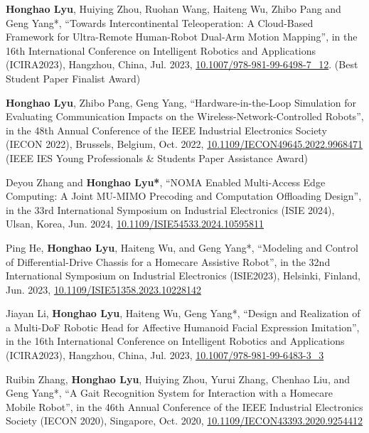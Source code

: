 \begin{enumerate}[align=left, widest={[\textbf{S.1}]}, itemindent=0em, label={\textbf{[\arabic*]}]
    \item[\textbf{[C.16]}] \textbf{Honghao Lyu}, Huiying Zhou, Ruohan Wang, Haiteng Wu, Zhibo Pang and Geng Yang*, ``Towards Intercontinental Teleoperation: A Cloud-Based Framework for Ultra-Remote Human-Robot Dual-Arm Motion Mapping'', in the 16th International Conference on Intelligent Robotics and Applications (ICIRA2023), Hangzhou, China, Jul. 2023, \href{https://doi.org/10.1007/978-981-99-6498-7_12}{10.1007/978-981-99-6498-7\_12}. (Best Student Paper Finalist Award)
    \item[\textbf{[C.15]}] \textbf{Honghao Lyu}, Zhibo Pang, Geng Yang, ``Hardware-in-the-Loop Simulation for Evaluating Communication Impacts on the Wireless-Network-Controlled Robots'', in the 48th Annual Conference of the IEEE Industrial Electronics Society (IECON 2022), Brussels, Belgium, Oct. 2022, \href{https://doi.org/10.1109/IECON49645.2022.9968471}{10.1109/IECON49645.2022.9968471} (IEEE IES Young Professionals \& Students Paper Assistance Award)
    \item[\textbf{[C.14]}] Deyou Zhang and \textbf{Honghao Lyu*}, ``NOMA Enabled Multi-Access Edge Computing: A Joint MU-MIMO Precoding and Computation Offloading Design'', in the 33rd International Symposium on Industrial Electronics (ISIE 2024), Ulsan, Korea, Jun. 2024, \href{https://doi.org/10.1109/ISIE54533.2024.10595811}{10.1109/ISIE54533.2024.10595811}
    \item[\textbf{[C.13]}] Ping He, \textbf{Honghao Lyu}, Haiteng Wu, and Geng Yang*, ``Modeling and Control of Differential-Drive Chassis for a Homecare Assistive Robot'', in the 32nd International Symposium on Industrial Electronics (ISIE2023), Helsinki, Finland, Jun. 2023, \href{https://doi.org/10.1109/ISIE51358.2023.10228142}{10.1109/ISIE51358.2023.10228142}
    \item[\textbf{[C.12]}] Jiayan Li, \textbf{Honghao Lyu}, Haiteng Wu, Geng Yang*, ``Design and Realization of a Multi-DoF Robotic Head for Affective Humanoid Facial Expression Imitation'', in the 16th International Conference on Intelligent Robotics and Applications (ICIRA2023), Hangzhou, China, Jul. 2023, \href{https://doi.org/10.1007/978-981-99-6483-3_3}{10.1007/978-981-99-6483-3\_3}
    \item[\textbf{[C.11]}] Ruibin Zhang, \textbf{Honghao Lyu}, Huiying Zhou, Yurui Zhang, Chenhao Liu, and Geng Yang*, ``A Gait Recognition System for Interaction with a Homecare Mobile Robot'', in the 46th Annual Conference of the IEEE Industrial Electronics Society (IECON 2020), Singapore, Oct. 2020, \href{https://doi.org/10.1109/IECON43393.2020.9254412}{10.1109/IECON43393.2020.9254412}

\end{enumerate}

